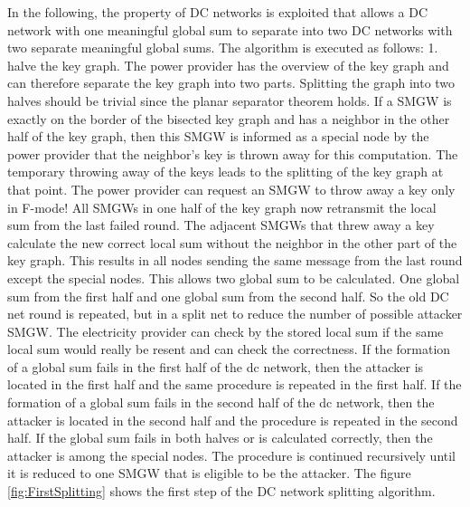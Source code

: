 In the following, the property of DC networks is exploited that allows a DC network with one meaningful global sum to separate into two DC networks with two separate meaningful global sums.
The algorithm is executed as follows:
1. halve the key graph. 
The power provider has the overview of the key graph and can therefore separate the key graph into two parts. Splitting the graph into two halves should be trivial since the planar separator theorem holds.
If a SMGW is exactly on the border of the bisected key graph and has a neighbor in the other half of the key graph, then this SMGW is informed as a special node by the power provider that the neighbor's key is thrown away for this computation. The temporary throwing away of the keys leads to the splitting of the key graph at that point. The power provider can request an SMGW to throw away a key only in F-mode! All SMGWs in one half of the key graph now retransmit the local sum from the last failed round. The adjacent SMGWs that threw away a key calculate the new correct local sum without the neighbor in the other part of the key graph. This results in all nodes sending the same message from the last round except the special nodes. This allows two global sum to be calculated. One global sum from the first half and one global sum from the second half. So the old DC net round is repeated, but in a split net to reduce the number of possible attacker SMGW. The electricity provider can check by the stored local sum if the same local sum would really be resent and can check the correctness. 
If the formation of a global sum fails in the first half of the dc network, then the attacker is located in the first half and the same procedure is repeated in the first half. If the formation of a global sum fails in the second half of the dc network, then the attacker is located in the second half and the procedure is repeated in the second half. 
If the global sum fails in both halves or is calculated correctly, then the attacker is among the special nodes.
The procedure is continued recursively until it is reduced to one SMGW that is eligible to be the attacker. The figure \ref{fig:FirstSplitting} shows the first step of the DC network splitting algorithm.

